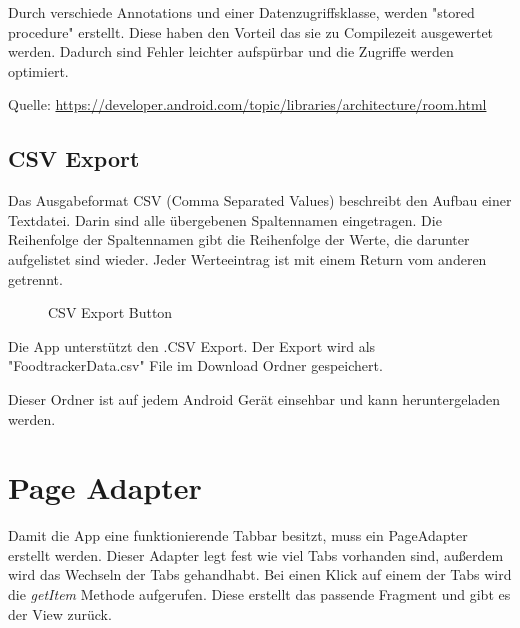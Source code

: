 \documentclass[
    DIV12,
    cleardouble=plain,
    headings=normal,
    pdftex,
    headexclude,footexclude,
    final
]{scrreprt}
\begin{document}
Durch verschiede Annotations und einer Datenzugriffsklasse, werden "stored procedure" erstellt.
Diese haben den Vorteil das sie zu Compilezeit ausgewertet werden. Dadurch sind Fehler leichter aufspürbar und die Zugriffe werden optimiert.




Quelle:
\url{https://developer.android.com/topic/libraries/architecture/room.html}


\subsection{CSV Export}
Das Ausgabeformat CSV (Comma Separated Values) beschreibt den Aufbau einer Textdatei. Darin sind alle übergebenen Spaltennamen eingetragen. Die Reihenfolge der Spaltennamen gibt die Reihenfolge der Werte, die darunter aufgelistet sind wieder. Jeder Werteeintrag ist mit einem Return vom anderen getrennt.\\

\begin{figure}[H]
	\centering
	\caption{CSV Export Button}
	\label{csv_button}
\end{figure}

Die App unterstützt den .CSV Export. Der Export wird als "FoodtrackerData.csv" File im Download Ordner gespeichert.



Dieser Ordner ist auf jedem Android Gerät einsehbar und kann heruntergeladen werden.

\newpage

\section{Page Adapter}
Damit die App eine funktionierende Tabbar besitzt, muss ein PageAdapter erstellt werden. Dieser Adapter legt fest wie viel Tabs vorhanden sind, außerdem wird das Wechseln der Tabs gehandhabt. Bei einen Klick auf einem der Tabs wird die \textit{getItem} Methode aufgerufen. Diese erstellt das passende Fragment und gibt es der View zurück.\\
\end{document}
